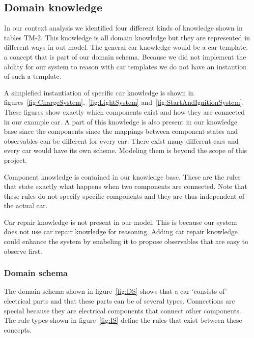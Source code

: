 \documentclass[a4paper,10pt]{article}
\begin{document}
\subsection{Domain knowledge}
In our context analysis we identified four different kinds of knowledge shown in tables TM-2. This knowledge is all domain knowledge but they are represented in different ways in out model. The general car knowledge would be a car template, a concept that is part of our domain schema. Because we did not implement the ability for our system to reason with car templates we do not have an instantion of such a template.

A simplefied instantiation of specific car knowledge is shown in figures~\ref{fig:ChargeSystem},~\ref{fig:LightSystem} and~\ref{fig:StartAndIgnitionSystem}. These figures show exactly which components exist and how they are connected in our example car. A part of this knowledge is also present in our knowledge base since the components since the mappings between component states and observables can be different for every car. There exist many different cars and every car would have its own scheme. Modeling them is beyond the scope of this project.

Component knowledge is contained in our knowledge base. These are the rules that state exactly what happens when two components are connected. Note that these rules do not specify specific components and they are thus independent of the actual car.

Car repair knowledge is not present in our model. This is because our system does not use car repair knowledge for reasoning. Adding car repair knowledge could enhance the system by enabeling it to propose observables that are easy to observe first.

\subsubsection{Domain schema}
The domain schema shown in figure~\ref{fig:DS} shows that a car `consists of' electrical parts and that these parts can be of several types. Connections are special because they are electrical components that connect other components. The rule types shown in figure~\ref{fig:IS} define the rules that exist between these concepts. 
\end{document}
